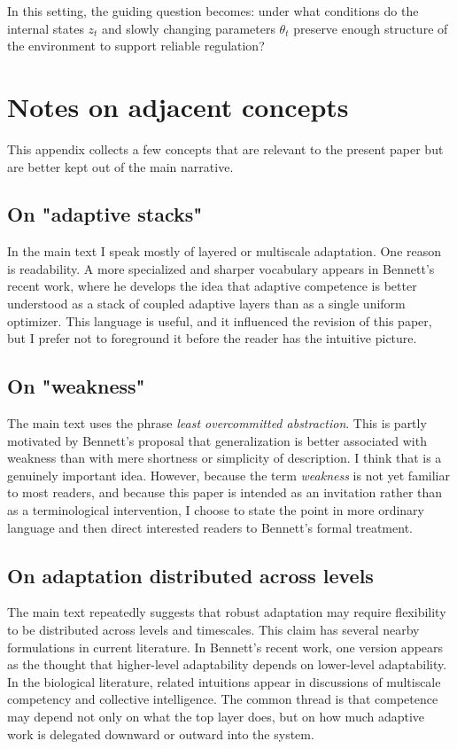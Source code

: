 \documentclass[11pt]{article}
\begin{document}
In this setting, the guiding question becomes: under what conditions do the internal states \(z_t\) and slowly changing parameters \(\theta_t\) preserve enough structure of the environment to support reliable regulation?

\section{Notes on adjacent concepts}


This appendix collects a few concepts that are relevant to the present paper but are better kept out of the main narrative.

\subsection{On "adaptive stacks"}


In the main text I speak mostly of layered or multiscale adaptation. One reason is readability. A more specialized and sharper vocabulary appears in Bennett's recent work, where he develops the idea that adaptive competence is better understood as a stack of coupled adaptive layers than as a single uniform optimizer. This language is useful, and it influenced the revision of this paper, but I prefer not to foreground it before the reader has the intuitive picture.

\subsection{On "weakness"}


The main text uses the phrase \textit{least overcommitted abstraction}. This is partly motivated by Bennett's proposal that generalization is better associated with weakness than with mere shortness or simplicity of description. I think that is a genuinely important idea. However, because the term \textit{weakness} is not yet familiar to most readers, and because this paper is intended as an invitation rather than as a terminological intervention, I choose to state the point in more ordinary language and then direct interested readers to Bennett's formal treatment.

\subsection{On adaptation distributed across levels}


The main text repeatedly suggests that robust adaptation may require flexibility to be distributed across levels and timescales. This claim has several nearby formulations in current literature. In Bennett's recent work, one version appears as the thought that higher-level adaptability depends on lower-level adaptability. In the biological literature, related intuitions appear in discussions of multiscale competency and collective intelligence. The common thread is that competence may depend not only on what the top layer does, but on how much adaptive work is delegated downward or outward into the system.
\end{document}
